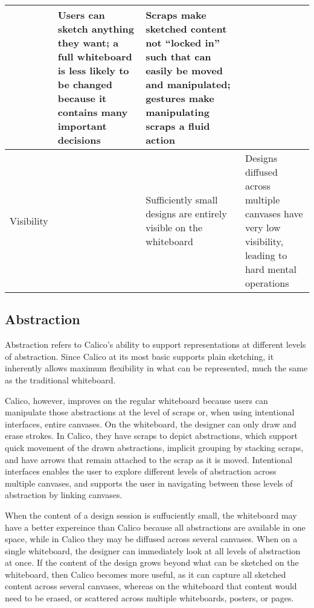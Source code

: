 \documentclass[12pt,fleqn]{ucithesis}
\begin{document}
\begin{center}
\begin{longtable}{|p{3cm}|p{4cm}|p{4cm}|p{4cm}|}
& %
Users can sketch anything they want; a full whiteboard is less likely to be changed because it contains many important decisions
& %
Scraps make sketched content not ``locked in'' such that can easily be moved and manipulated; gestures make manipulating scraps a fluid action
\\
\hline
Visibility	
& %

& %
Sufficiently small designs are entirely visible on the whiteboard
& %
Designs diffused across multiple canvases have very low visibility, leading to hard mental operations
\label{table:discussion:cognitivedimensions}
\end{longtable}
\end{center}

\subsection{Abstraction}
Abstraction refers to Calico's ability to support representations at different levels of abstraction. Since Calico at its most basic supports plain sketching, it inherently allows maximum flexibility in what can be represented, much the same as the traditional whiteboard. 

Calico, however, improves on the regular whiteboard because users can manipulate those abstractions at the level of scraps or, when using intentional interfaces, entire canvases. On the whiteboard, the designer can only draw and erase strokes. In Calico, they have scraps to depict abstractions, which support quick movement of the drawn abstractions, implicit grouping by stacking scraps, and have arrows that remain attached to the scrap as it is moved. Intentional interfaces enables the user to explore different levels of abstraction across multiple canvases, and supports the user in navigating between these levels of abstraction by linking canvases. 

When the content of a design session is suffuciently small, the whiteboard may have a better expereince than Calico because all abstractions are available in one space, while in Calico they may be diffused across several canvases. When on a single whiteboard, the designer can immediately look at all levels of abstraction at once. If the content of the design grows beyond what can be sketched on the whiteboard, then Calico becomes more useful, as it can capture all sketched content across several canvases, whereas on the whiteboard that content would need to be erased, or scattered across multiple whiteboards, posters, or pages. 
\end{document}
